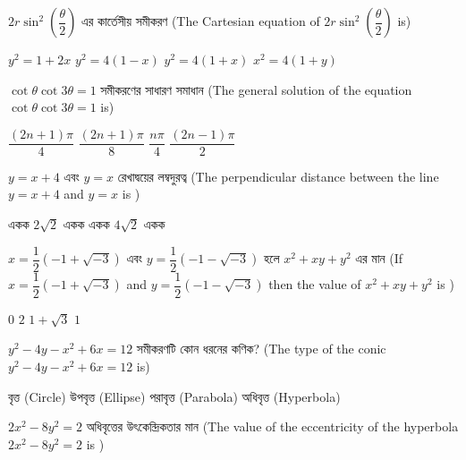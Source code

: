 \documentclass[addpoints]{exam}
\begin{document}
\begin{questions}
\begin{oneparchoices}
\end{oneparchoices}

\question  $ 2r\sin^{2}(\dfrac{\theta}{2}) $ এর কার্তেসীয় সমীকরণ (The Cartesian equation of $ 2r\sin^{2}(\dfrac{\theta}{2}) $ is)

\begin{oneparchoices}
\choice $ y^{2} = 1+2x $
\choice $ y^{2} = 4(1-x) $
\choice $ y^{2} = 4(1+x) $
\choice $ x^{2} = 4(1+y) $

\end{oneparchoices}

\question   $ \cot\theta \cot 3\theta =1 $ সমীকরণের সাধারণ সমাধান  (The general solution of the equation $ \cot\theta \cot 3\theta =1 $ is)

\begin{oneparchoices}
\choice $ \dfrac{(2n+1)\pi}{4} $
\choice $ \dfrac{(2n+1)\pi}{8} $
\choice $ \dfrac{n\pi}{4} $
\choice  $ \dfrac{(2n-1)\pi}{2} $

\end{oneparchoices}

\question $ y=x+4 $  এবং $ y=x $  রেখাদ্বয়ের লম্বদুরত্ব (The perpendicular distance between the line $ y=x+4 $ and $ y=x $ is ) 

\begin{oneparchoices}
 একক
\choice $2\sqrt{2}$ একক
 একক
\choice  $ 4\sqrt{2} $ একক
\end{oneparchoices}

\question $ x = \dfrac{1}{2}(-1+\sqrt{-3}) $  এবং $ y = \dfrac{1}{2}(-1-\sqrt{-3})  $ হলে $ x^{2} + xy + y^{2} $ এর মান (If $ x = \dfrac{1}{2}(-1+\sqrt{-3}) $ and $ y = \dfrac{1}{2}(-1-\sqrt{-3})  $ then the value of  $ x^{2} + xy + y^{2} $ is )

\begin{oneparchoices}
\choice $ 0 $
\choice $ 2 $
\choice $ 1 + \sqrt{3} $
\choice  $ 1 $

\end{oneparchoices}

\question  $ y^{2}-4y-x^{2}+6x =12 $  সমীকরণটি কোন ধরনের কণিক? (The type of the conic $ y^{2}-4y-x^{2}+6x =12 $ is)

\begin{oneparchoices}
\choice বৃত্ত (Circle)
\choice উপবৃত্ত (Ellipse)
\choice পরাবৃত্ত (Parabola)
\choice  অধিবৃত্ত (Hyperbola)

\end{oneparchoices}

\question  $ 2x^{2}-8y^{2} = 2 $ অধিবৃত্তের উৎকেন্দ্রিকতার মান (The value of the eccentricity of the hyperbola $ 2x^{2}-8y^{2} = 2 $ is )


\end{questions}
\end{document}
